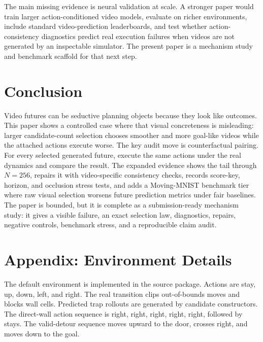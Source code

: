 \documentclass{article}
\begin{document}
The main missing evidence is neural validation at scale. A stronger paper would train larger action-conditioned video models, evaluate on richer environments, include standard video-prediction leaderboards, and test whether action-consistency diagnostics predict real execution failures when videos are not generated by an inspectable simulator. The present paper is a mechanism study and benchmark scaffold for that next step.

\section{Conclusion}

Video futures can be seductive planning objects because they look like outcomes. This paper shows a controlled case where that visual concreteness is misleading: larger candidate-count selection chooses smoother and more goal-like videos while the attached actions execute worse. The key audit move is counterfactual pairing. For every selected generated future, execute the same actions under the real dynamics and compare the result. The expanded evidence shows the tail through \(N=256\), repairs it with video-specific consistency checks, records score-key, horizon, and occlusion stress tests, and adds a Moving-MNIST benchmark tier where raw visual selection worsens future prediction metrics under fair baselines. The paper is bounded, but it is complete as a submission-ready mechanism study: it gives a visible failure, an exact selection law, diagnostics, repairs, negative controls, benchmark stress, and a reproducible claim audit.




\appendix
\setcounter{section}{0}
\renewcommand{\thesection}{A.\arabic{section}}
\renewcommand{\thesubsection}{A.\arabic{section}.\arabic{subsection}}

\section{Appendix: Environment Details}
\label{app:environment}

The default environment is implemented in the source package. Actions are stay, up, down, left, and right. The real transition clips out-of-bounds moves and blocks wall cells. Predicted trap rollouts are generated by candidate constructors. The direct-wall action sequence is right, right, right, right, right, followed by stays. The valid-detour sequence moves upward to the door, crosses right, and moves down to the goal.
\end{document}
